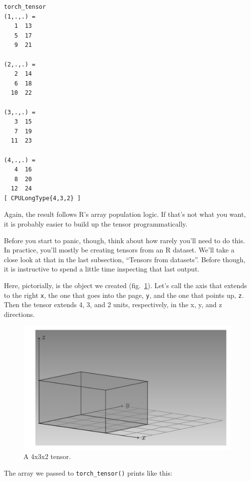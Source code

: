 \documentclass[
  letterpaper,
]{krantz}
\begin{document}
\begin{verbatim}
torch_tensor
(1,.,.) = 
   1  13
   5  17
   9  21

(2,.,.) = 
   2  14
   6  18
  10  22

(3,.,.) = 
   3  15
   7  19
  11  23

(4,.,.) = 
   4  16
   8  20
  12  24
[ CPULongType{4,3,2} ]
\end{verbatim}

Again, the result follows R's array population logic. If that's not what
you want, it is probably easier to build up the tensor programmatically.

Before you start to panic, though, think about how rarely you'll need to
do this. In practice, you'll mostly be creating tensors from an R
dataset. We'll take a close look at that in the last subsection,
``Tensors from datasets''. Before though, it is instructive to spend a
little time inspecting that last output.

Here, pictorially, is the object we created
(fig.~\ref{fig-tensors-dimensions}). Let's call the axis that extends to
the right \texttt{x}, the one that goes into the page, \texttt{y}, and
the one that points up, \texttt{z}. Then the tensor extends 4, 3, and 2
units, respectively, in the x, y, and z directions.

\begin{figure}[H]

{\centering \includegraphics{images/tensors-dimensions.png}

}

\caption{\label{fig-tensors-dimensions}A 4x3x2 tensor.}

\end{figure}

The array we passed to \texttt{torch\_tensor()} prints like this:
\end{document}
